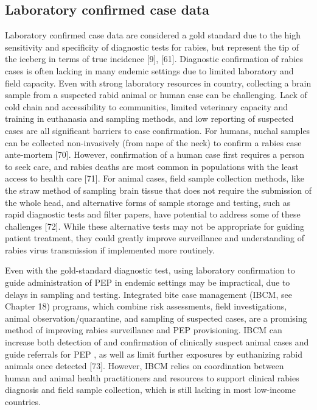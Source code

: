 \documentclass[
  oneside]{book}
\begin{document}
\hypertarget{laboratory-confirmed-case-data}{%
\subsection{Laboratory confirmed case data}\label{laboratory-confirmed-case-data}}

Laboratory confirmed case data are considered a gold standard due to the
high sensitivity and specificity of diagnostic tests for rabies, but
represent the tip of the iceberg in terms of true incidence {[}9{]},
{[}61{]}. Diagnostic confirmation of rabies cases is often lacking in many
endemic settings due to limited laboratory and field capacity. Even with
strong laboratory resources in country, collecting a brain sample from a
suspected rabid animal or human case can be challenging. Lack of cold
chain and accessibility to communities, limited veterinary capacity and
training in euthanasia and sampling methods, and low reporting of
suspected cases are all significant barriers to case confirmation. For
humans, nuchal samples can be collected non-invasively (from nape of the
neck) to confirm a rabies case ante-mortem {[}70{]}. However, confirmation
of a human case first requires a person to seek care, and rabies deaths
are most common in populations with the least access to health care
{[}71{]}. For animal cases, field sample collection methods, like the
straw method of sampling brain tissue that does not require the
submission of the whole head, and alternative forms of sample storage
and testing, such as rapid diagnostic tests and filter papers, have
potential to address some of these challenges {[}72{]}. While these
alternative tests may not be appropriate for guiding patient treatment,
they could greatly improve surveillance and understanding of rabies
virus transmission if implemented more routinely.

Even with the gold-standard diagnostic test, using laboratory
confirmation to guide administration of PEP in endemic settings may be
impractical, due to delays in sampling and testing. Integrated bite case
management (IBCM, see Chapter 18) programs, which combine risk
assessments, field investigations, animal observation/quarantine, and
sampling of suspected cases, are a promising method of improving rabies
surveillance and PEP provisioning. IBCM can increase both detection of
and confirmation of clinically suspect animal cases and guide referrals
for PEP , as well as limit further exposures by euthanizing rabid
animals once detected {[}73{]}. However, IBCM relies on coordination
between human and animal health practitioners and resources to support
clinical rabies diagnosis and field sample collection, which is still
lacking in most low-income countries.
\end{document}
